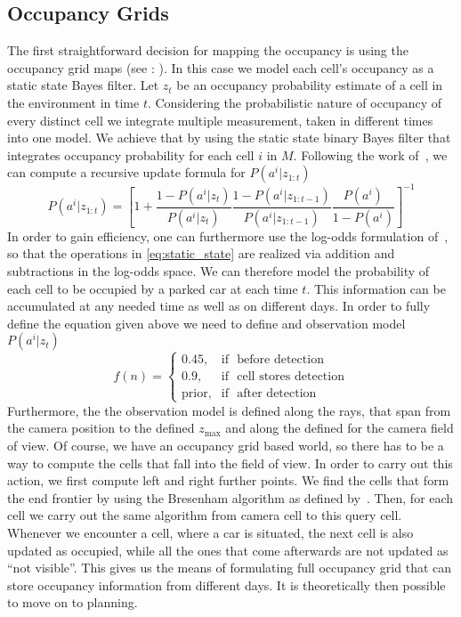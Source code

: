     \subsection{Occupancy Grids}\label{sub:occupancy_grids}
        The first straightforward decision for mapping the occupancy is using the occupancy grid maps (see : ). In this case we model each cell's occupancy as a static state Bayes filter.
        Let $z_t$ be an occupancy probability estimate of a cell in the environment in time $t$. Considering the probabilistic nature of occupancy of every distinct cell we integrate multiple measurement, taken in different times into one model. We achieve that by using the static state binary Bayes filter that integrates occupancy probability for each cell $i$ in $M$. Following the work of~\cite{moravec1988}, we can compute a recursive update formula for $P(a^i | z_{1:t})$
        \begin{equation}
        \label{eq:static_state}
            P(a^i | z_{1:t}) = \left[ {1 + \frac{1 - P(a^i | z_{t})}{P(a^i | z_{t})} \frac{1 - P(a^i | z_{1:t-1})}{P(a^i | z_{1:t-1})} \frac{P(a^i)}{1 - P(a^i)}} \right]^{-1}
        \end{equation}
        In order to gain efficiency, one can furthermore use the log-odds formulation of~\cite{moravec1988}, so that the operations in \eqref{eq:static_state} are realized via addition and subtractions in the log-odds space.
        We can therefore model the probability of each cell to be occupied by a parked car at each time $t$.
        This information can be accumulated at any needed time as well as on different days.
        In order to fully define the equation given above we need to define and observation model $P(a^i | z_t)$
        \begin{equation}
        \label{eq:observation_model}
            f(n) = \begin{cases} 0.45, & \mbox{if } \mbox{ before detection} \\ 0.9, & \mbox{if } \mbox{ cell stores detection} \\ \mbox{prior}, & \mbox{if } \mbox{ after detection} \end{cases}
        \end{equation}
        Furthermore, the the observation model is defined along the rays, that span from the camera position to the defined $z_{\max}$ and along the defined for the camera field of view. Of course, we have an occupancy grid based world, so there has to be a way to compute the cells that fall into the field of view. In order to carry out this action, we first compute left and right further points. We find the cells that form the end frontier by using the Bresenham algorithm as defined by~\cite{bresenham1965}. Then, for each cell we carry out the same algorithm from camera cell to this query cell. Whenever we encounter a cell, where a car is situated, the next cell is also updated as occupied, while all the ones that come afterwards are not updated as ``not visible''.
        This gives us the means of formulating full occupancy grid that can store occupancy information from different days. It is theoretically then possible to move on to planning.
